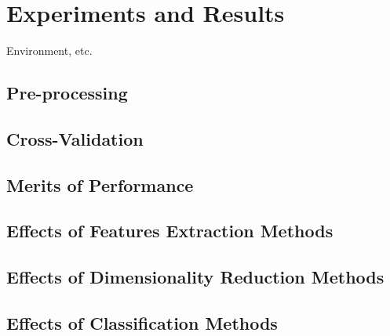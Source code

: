 \chapter{Experiments and Results}
\label{chap:experiments}

Environment, etc.

\section{Pre-processing}
\label{sec:pre-processing}

\section{Cross-Validation}

\section{Merits of Performance}

\section{Effects of Features Extraction Methods}
\label{sec:effects-fe}

\section{Effects of Dimensionality Reduction Methods}
\label{sec:effects-dim}

\section{Effects of Classification Methods}
\label{sec:effects-cls}

